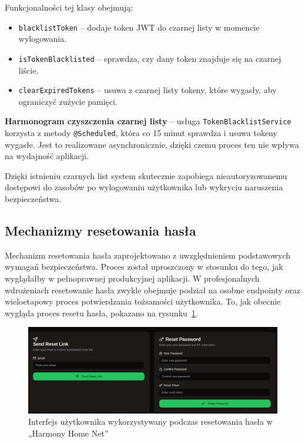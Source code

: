Funkcjonalności tej klasy obejmują:
\begin{itemize}
    \item \texttt{blacklistToken} -- dodaje token JWT do czarnej listy w momencie wylogowania.
    \item \texttt{isTokenBlacklisted} -- sprawdza, czy dany token znajduje się na czarnej liście.
    \item \texttt{clearExpiredTokens} -- usuwa z czarnej listy tokeny, które wygasły, aby ograniczyć zużycie pamięci.
\end{itemize}

\textbf{Harmonogram czyszczenia czarnej listy} --  usługa \texttt{TokenBlacklistService} korzysta z metody \texttt{@Scheduled}, która co 15 minut sprawdza i usuwa tokeny wygasłe. Jest to realizowane asynchronicznie, dzięki czemu proces ten nie wpływa na wydajność aplikacji.

Dzięki istnieniu czarnych list system skutecznie zapobiega nieautoryzowanemu dostępowi do zasobów po wylogowaniu użytkownika lub wykryciu naruszenia bezpieczeństwa.

\subsection{Mechanizmy resetowania hasła}

Mechanizm resetowania hasła zaprojektowano z uwzględnieniem podstawowych wymagań bezpieczeństwa. Proces został uproszczony w stosunku do tego, jak wyglądałby w pełnoprawnej produkcyjnej aplikacji. W profesjonalnych wdrożeniach resetowanie hasła zwykle obejmuje podział na osobne endpointy oraz wieloetapowy proces potwierdzania tożsamości użytkownika. To, jak obecnie wygląda proces resetu hasła, pokazano na rysunku~\ref{fig:ui_password_reset}.

\begin{figure}[ht]
    \centering
    \includegraphics[width=0.95\linewidth]{rys03/pass_resert}
    \caption{Interfejs użytkownika wykorzystywany podczas resetowania hasła w „Harmony Home Net”}
    \label{fig:ui_password_reset}
\end{figure}

